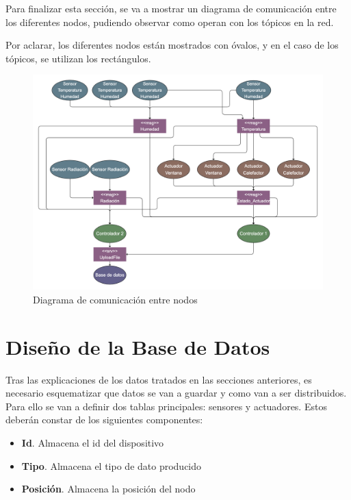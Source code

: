 Para finalizar esta sección, se va a mostrar un diagrama de comunicación entre los diferentes nodos, pudiendo observar como operan con los tópicos en la red.

Por aclarar, los diferentes nodos están mostrados con óvalos, y en el caso de los tópicos, se utilizan los rectángulos.

\begin{landscape}
\begin{figure}
    \centering
    \includegraphics[width=1.6\textwidth]{img/05-DiagramaComunicacion.png}
    \caption{Diagrama de comunicación entre nodos}
    \label{fig:diagrama-comunicacion-nodos}
\end{figure}
\end{landscape}


\section{Diseño de la Base de Datos}

Tras las explicaciones de los datos tratados en las secciones anteriores, es necesario esquematizar que datos se van a guardar y como van a ser distribuidos. Para ello se van a definir dos tablas principales: sensores y actuadores. Estos deberán constar de los siguientes componentes:

\begin{itemize}
    \item \textbf{Id}. Almacena el id del dispositivo
    \item \textbf{Tipo}. Almacena el tipo de dato producido
    \item \textbf{Posición}. Almacena la posición del nodo
\end{itemize}

